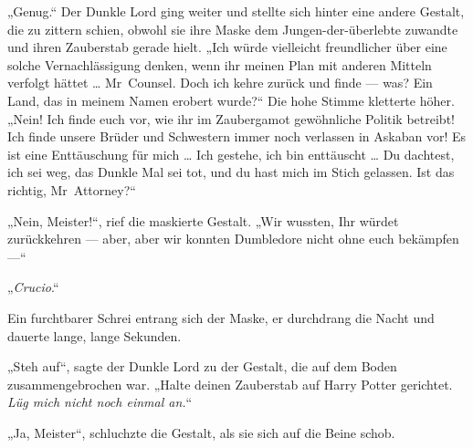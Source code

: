 „Genug.“ Der Dunkle Lord ging weiter und stellte sich hinter eine andere Gestalt, die zu zittern schien, obwohl sie ihre Maske dem Jungen-der-überlebte zuwandte und ihren Zauberstab gerade hielt.
„Ich würde vielleicht freundlicher über eine solche Vernachlässigung denken, wenn ihr meinen Plan mit anderen Mitteln verfolgt hättet … Mr~Counsel. Doch ich kehre zurück und finde — was? Ein Land, das in meinem Namen erobert wurde?“
Die hohe Stimme kletterte höher.
„Nein! Ich finde euch vor, wie ihr im Zaubergamot gewöhnliche Politik betreibt! Ich finde unsere Brüder und Schwestern immer noch verlassen in Askaban vor! Es ist eine Enttäuschung für mich … Ich gestehe, ich bin enttäuscht … Du dachtest, ich sei weg, das Dunkle Mal sei tot, und du hast mich im Stich gelassen. Ist das richtig, Mr~Attorney?“

„Nein, Meister!“, rief die maskierte Gestalt.
„Wir wussten, Ihr würdet zurückkehren — aber, aber wir konnten Dumbledore nicht ohne euch bekämpfen —“

„\emph{Crucio}.“

Ein furchtbarer Schrei entrang sich der Maske, er durchdrang die Nacht und dauerte lange, lange Sekunden.

„Steh auf“, sagte der Dunkle Lord zu der Gestalt, die auf dem Boden zusammengebrochen war.
„Halte deinen Zauberstab auf Harry Potter gerichtet. \emph{Lüg mich nicht noch einmal an.}“

„Ja, Meister“, schluchzte die Gestalt, als sie sich auf die Beine schob.

